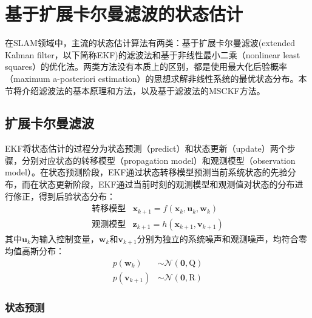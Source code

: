 \section{基于扩展卡尔曼滤波的状态估计}

在SLAM领域中，主流的状态估计算法有两类：基于扩展卡尔曼滤波(extended Kalman filter，以下简称EKF)的滤波法和基于非线性最小二乘（nonlinear least squares）的优化法。两类方法没有本质上的区别，都是使用最大化后验概率（maximum a-posteriori estimation）的思想求解非线性系统的最优状态分布。本节将介绍滤波法的基本原理和方法，以及基于滤波法的MSCKF方法。

\subsection{扩展卡尔曼滤波}

EKF将状态估计的过程分为状态预测（predict）和状态更新（update）两个步骤，分别对应状态的转移模型（propagation model）和观测模型（observation model）。在状态预测阶段，EKF通过状态转移模型预测当前系统状态的先验分布，而在状态更新阶段，EKF通过当前时刻的观测模型和观测值对状态的分布进行修正，得到后验状态分布：
\begin{equation}
\begin{array}{rl}
    \text{转移模型} & \bm{x}_{k+1} = f(\bm{x}_k,\bm{u}_k,\bm{w}_k) \\
    \text{观测模型} & \bm{z}_{k+1} = h(\bm{x}_{k+1},\bm{v}_{k+1})
\end{array}
\end{equation}
其中$\bm{u}_k$为输入控制变量，$\bm{w}_k$和$\bm{v}_{k+1}$分别为独立的系统噪声和观测噪声，均符合零均值高斯分布：
\begin{equation}
\begin{aligned}
    p(\bm{w}_k)     &\sim \mathcal{N}(\bm{0},\mathrm{Q}) \\
    p(\bm{v}_{k+1}) &\sim \mathcal{N}(\bm{0},\mathrm{R})
\end{aligned}
\end{equation}

\subsubsection{状态预测}

